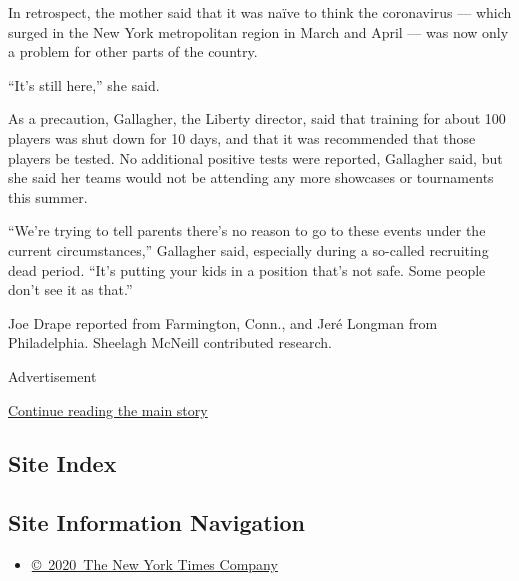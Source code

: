 In retrospect, the mother said that it was naïve to think the
coronavirus --- which surged in the New York metropolitan region in
March and April --- was now only a problem for other parts of the
country.

``It's still here,'' she said.

As a precaution, Gallagher, the Liberty director, said that training for
about 100 players was shut down for 10 days, and that it was recommended
that those players be tested. No additional positive tests were
reported, Gallagher said, but she said her teams would not be attending
any more showcases or tournaments this summer.

``We're trying to tell parents there's no reason to go to these events
under the current circumstances,'' Gallagher said, especially during a
so-called recruiting dead period. ``It's putting your kids in a position
that's not safe. Some people don't see it as that.''

Joe Drape reported from Farmington, Conn., and Jeré Longman from
Philadelphia. Sheelagh McNeill contributed research.

Advertisement

\protect\hyperlink{after-bottom}{Continue reading the main story}

\hypertarget{site-index}{%
\subsection{Site Index}\label{site-index}}

\hypertarget{site-information-navigation}{%
\subsection{Site Information
Navigation}\label{site-information-navigation}}

\begin{itemize}
\tightlist
\item
  \href{https://help.nytimes3xbfgragh.onion/hc/en-us/articles/115014792127-Copyright-notice}{©~2020~The
  New York Times Company}
\end{itemize}


